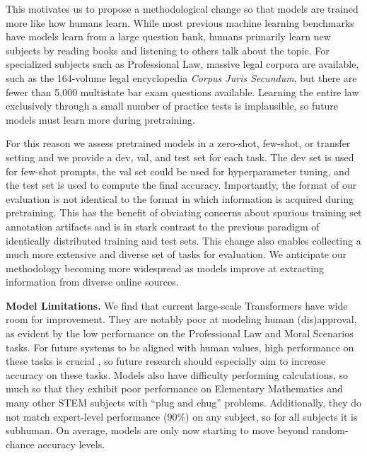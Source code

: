 This motivates us to propose a methodological change so that models are trained more like how humans learn. While most previous machine learning benchmarks have models learn from a large question bank, humans primarily learn new subjects by reading books and listening to others talk about the topic. For specialized subjects such as Professional Law, massive legal corpora are available, such as the 164-volume legal encyclopedia \emph{Corpus Juris Secundum}, but there are fewer than 5,000 multistate bar exam questions available. Learning the entire law exclusively through a small number of practice tests is implausible, so future models must learn more during pretraining. 

For this reason we assess pretrained models in a zero-shot, few-shot, or transfer setting and we provide a dev, val, and test set for each task. The dev set is used for few-shot prompts, the val set could be used for hyperparameter tuning, and the test set is used to compute the final accuracy. Importantly, the format of our evaluation is not identical to the format in which information is acquired during pretraining. This has the benefit of obviating concerns about spurious training set annotation artifacts \citep{geirhos2020shortcut,Hendrycks2019NaturalAE} and is in stark contrast to the previous paradigm of identically distributed training and test sets. This change also enables collecting a much more extensive and diverse set of tasks for evaluation. We anticipate our methodology becoming more widespread as models improve at extracting information from diverse online sources.

\textbf{Model Limitations.}\quad
We find that current large-scale Transformers have wide room for improvement. They are notably poor at modeling human (dis)approval, as evident by the low performance on the Professional Law and Moral Scenarios tasks. For future systems to be aligned with human values, high performance on these tasks is crucial \citep{hendrycks2020ethicsdataset}, so future research should especially aim to increase accuracy on these tasks. Models also have difficulty performing calculations, so much so that they exhibit poor performance on Elementary Mathematics and many other STEM subjects with ``plug and chug'' problems. Additionally, they do not match expert-level performance (90\%) on any subject, so for all subjects it is subhuman. On average, models are only now starting to move beyond random-chance accuracy levels.


